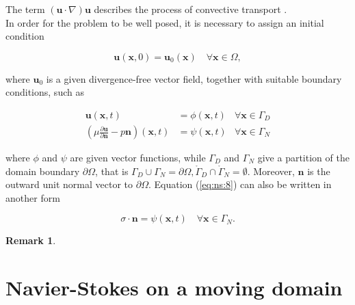 \documentclass[a4paper,11pt,openright,twoside]{book}
\newtheorem*{remark}{Remark}
\begin{document}
The term $(\mathbf{u} \cdot \nabla)\mathbf{u}$ describes the process of convective transport \cite{quarteroni1}.\\
In order for the problem to be well posed, it is necessary to assign an initial condition

\begin{equation}
\mathbf{u} (\mathbf{x}, 0) = \mathbf{u}_0(\mathbf{x}) \quad \forall \mathbf{x} \in \Omega,
\end{equation}

where $\mathbf{u}_0$ is a given divergence-free vector field, together with suitable boundary conditions, such as

\begin{align}
\mathbf{u}(\mathbf{x},t) &= \phi (\mathbf{x}, t) & \forall \mathbf{x} \in \Gamma_D \\
\label{eq:ns:8}
\left( \mu \frac{\partial \mathbf{u}}{\partial \mathbf{n}} - p\mathbf{n} \right) (\mathbf{x},t) &= \psi(\mathbf{x},t) & \forall \mathbf{x} \in \Gamma_N
\end{align}


where $\phi$ and $\psi$ are given vector functions, while $\Gamma_D$ and $\Gamma_N$ give a partition of the domain boundary $\partial \Omega$, that is $\Gamma_D 	\cup \Gamma_N = \partial \Omega, \mathring{\Gamma}_D \cap \mathring{\Gamma}_N = \emptyset$. Moreover, $\mathbf{n}$ is the outward unit normal vector to $\partial \Omega$. Equation (\ref{eq:ns:8}) can also be written in another form

\begin{equation}
\sigma \cdot \mathbf{n} = \psi(\mathbf{x}, t)  \quad \forall \mathbf{x} \in \Gamma_N.
\end{equation}

\begin{remark}
\end{remark}


\section{Navier-Stokes on a moving domain}
\end{document}
